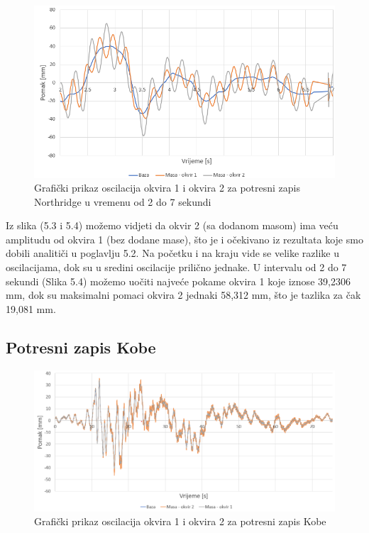 \documentclass[12pt]{book}
\begin{document}
\begin{figure}[H]
	\centering
	\includegraphics[width=1\linewidth]{Slike/northridge_0-10}
	\caption{Grafički prikaz oscilacija okvira 1 i okvira 2 za potresni zapis Northridge u vremenu od 2 do 7 sekundi}
	\label{fig:northridge0-10}
\end{figure}


Iz slika (5.3 i 5.4) možemo vidjeti da okvir 2 (sa dodanom masom) ima veću amplitudu od okvira 1 (bez dodane mase), što je i očekivano iz rezultata koje smo dobili analitiči u poglavlju 5.2. Na početku i na kraju vide se velike razlike u oscilacijama, dok su u sredini oscilacije prilično jednake. U intervalu od 2 do 7 sekundi (Slika 5.4) možemo uočiti najveće pokame okvira 1 koje iznose 39,2306 mm, dok su maksimalni pomaci okvira 2 jednaki 58,312 mm, što je tazlika za čak 19,081 mm.

\subsection{Potresni zapis Kobe}

\begin{figure}[H]
	\centering
	\includegraphics[width=1\linewidth]{Slike/kobe_graf}
	\caption{Grafički prikaz oscilacija okvira 1 i okvira 2 za potresni zapis Kobe}
	\label{fig:kobegraf}
\end{figure}
\end{document}
